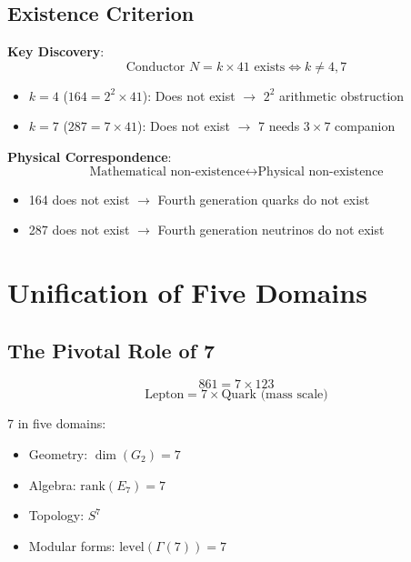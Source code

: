 ﻿\documentclass[11pt,a4paper]{article}
\begin{document}
\subsection{Existence Criterion}

\textbf{Key Discovery}:
\begin{equation}
    \text{Conductor } N = k \times 41 \text{ exists} \iff k \neq 4, 7
\end{equation}

\begin{itemize}
    \item $k=4$ ($164 = 2^2 \times 41$): Does not exist $\rightarrow$ $2^2$ arithmetic obstruction
    \item $k=7$ ($287 = 7 \times 41$): Does not exist $\rightarrow$ 7 needs $3 \times 7$ companion
\end{itemize}

\textbf{Physical Correspondence}:
\begin{equation}
    \text{Mathematical non-existence} \leftrightarrow \text{Physical non-existence}
\end{equation}

\begin{itemize}
    \item 164 does not exist $\rightarrow$ Fourth generation quarks do not exist
    \item 287 does not exist $\rightarrow$ Fourth generation neutrinos do not exist
\end{itemize}

\section{Unification of Five Domains}

\subsection{The Pivotal Role of 7}

\begin{equation}
    861 = 7 \times 123
\end{equation}
\begin{equation}
    \text{Lepton} = 7 \times \text{Quark (mass scale)}
\end{equation}

7 in five domains:
\begin{itemize}
    \item Geometry: $\dim(G_2) = 7$
    \item Algebra: $\text{rank}(E_7) = 7$
    \item Topology: $S^7$
    \item Modular forms: $\text{level}(\Gamma(7)) = 7$
\end{itemize}
\end{document}
